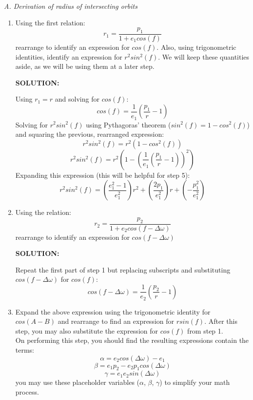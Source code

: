 \documentclass[12pt, letterpaper]{aiaa-tc}
\begin{document}
\raggedright \textit{A. Derivation of radius of intersecting orbits}
\begin{enumerate}
    
    \item Using the first relation:
    \[ r_1=\frac{p_1}{1+e_1 cos(f)} \]
    rearrange to identify an expression for $cos(f)$. Also, using trigonometric identities, identify an expression for
    $r^{2}sin^{2}(f)$. We will keep these quantities aside, as we will be using them at a later step.
    
    \textbf{SOLUTION:}
    
    Using $r_1=r$ and solving for $cos(f)$:
    \begin{equation}
        cos(f)=\frac{1}{e_1}\left (\frac{p_1}{r}-1 \right)
        \label{eq:cosf}
    \end{equation}
    Solving for $r^2sin^2(f)$ using Pythagoras' theorem ($sin^2(f)=1-cos^2(f)$) and squaring the previous, rearranged expression:
    \[ r^2sin^2(f) = r^2(1-cos^2(f)) \]
    \[ r^2sin^2(f) = r^2\left (1- \left(\frac{1}{e_1}\left (\frac{p_1}{r}-1 \right)\right)^2 \right) \]
    Expanding this expression (this will be helpful for step 5):
    \begin{equation}
        r^2sin^2(f) = \left(\frac{e_1^2-1}{e_1^2}\right)r^2+\left(\frac{2p_1}{e_1^2}\right)r+\left(-\frac{p_1^2}{e_1^2}\right)
        \label{eq:r^2sin^2f_1}
    \end{equation}
    \item Using the relation:
    \[ r_2=\frac{p_2}{1+e_2 cos(f-\Delta\omega)} \]
    rearrange to identify an expression for $cos(f-\Delta\omega)$

    \textbf{SOLUTION:}

    Repeat the first part of step 1 but replacing subscripts and substituting $cos(f-\Delta\omega)$ for $cos(f)$:
    \begin{equation}
        cos(f-\Delta\omega)=\frac{1}{e_2}\left (\frac{p_2}{r}-1 \right)
        \label{eq:cos(f-dw)}
    \end{equation}
    \item Expand the above expression using the trigonometric identity for $cos(A-B)$
    and rearrange to find an expression for $rsin(f)$. After this step, you may also substitute the expression for 
    $cos(f)$ from step 1.
    \\On performing this step, you should find the resulting expressions contain the terms:
    \[ \alpha=e_2cos(\Delta\omega)-e_1 \]
    \[ \beta=e_1p_2-e_2p_1cos(\Delta\omega) \]
    \[ \gamma=e_1e_2sin(\Delta\omega) \]
    you may use these placeholder variables ($\alpha$, $\beta$, $\gamma$) to simplify your math process.


\end{enumerate}
\end{document}
